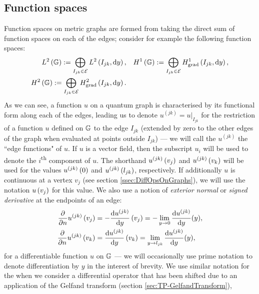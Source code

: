 \subsection{Function spaces} \label{ssec:QG-FunctionSpaces}
Function spaces on metric graphs are formed from taking the direct sum of function spaces on each of the edges; consider for example the following function spaces:
\begin{subequations} \label{eq:GraphFuncSpaces}
	\begin{align}
		L^2\left( \mathbb{G} \right) := \bigoplus_{I_{jk}\in \mathcal{E}} L^{2}\left( I_{jk},\mathrm{d}y \right),
		&\quad H^1\left( \mathbb{G} \right) := \bigoplus_{I_{jk}\in \mathcal{E}} H^1_\mathrm{grad}\left( I_{jk}, \mathrm{d}y \right), \\
		H^2\left( \mathbb{G} \right) := \bigoplus_{I_{jk}\in \mathcal{E}} H^2_\mathrm{grad}\left( I_{jk}, \mathrm{d} y \right). &
	\end{align}
\end{subequations}
As we can see, a function $u$ on a quantum graph is characterised by its functional form along each of the edges, leading us to denote $u^{(jk)} = u\vert_{I_{jk}}$ for the restriction of a function $u$ defined on $\mathbb{G}$ to the edge $I_{jk}$ (extended by zero to the other edges of the graph when evaluated at points outside $I_{jk}$) --- we will call the $u^{(jk)}$ the ``edge functions" of $u$.
If $u$ is a vector field, then the subscript $u_{i}$ will be used to denote the $i$\textsuperscript{th} component of $u$.
The shorthand $u^{(jk)}\left( v_j \right)$ and $u^{(jk)}\left( v_k \right)$ will be used for the values $u^{(jk)}\left( 0 \right)$ and $u^{(jk)}\left( l_{jk} \right)$, respectively.
If additionally $u$ is continuous at a vertex $v_j$ (see section \ref{ssec:DiffOpsOnGraphs}), we will use the notation $u\left( v_j \right)$ for this value.
We also use a notion of \emph{exterior normal} or \emph{signed derivative} at the endpoints of an edge:
\begin{subequations} \label{eq:SignedDerivConvention}
	\begin{align}
		\dfrac{\partial }{\partial n}u^{(jk)}\left( v_j \right) &= -\dfrac{\mathrm{d}u^{(jk)}}{\mathrm{d}y}\left( v_j \right) = -\lim_{y\rightarrow0}\dfrac{\mathrm{d}u^{(jk)}}{\mathrm{d}y}(y), \\
		\dfrac{\partial }{\partial n}u^{(jk)}\left( v_k \right) &= \dfrac{\mathrm{d}u^{(jk)}}{\mathrm{d}y}\left( v_k \right) = \lim_{y\rightarrow l_{jk}}\dfrac{\mathrm{d}u^{(jk)}}{\mathrm{d}y}(y),
	\end{align}
\end{subequations}
for a differentiable function $u$ on $\mathbb{G}$ --- we will occasionally use prime notation to denote differentiation by $y$ in the interest of brevity.
We use similar notation for the when we consider a differential operator that has been shifted due to an application of the Gelfand transform (section \ref{sec:TP-GelfandTransform}),
